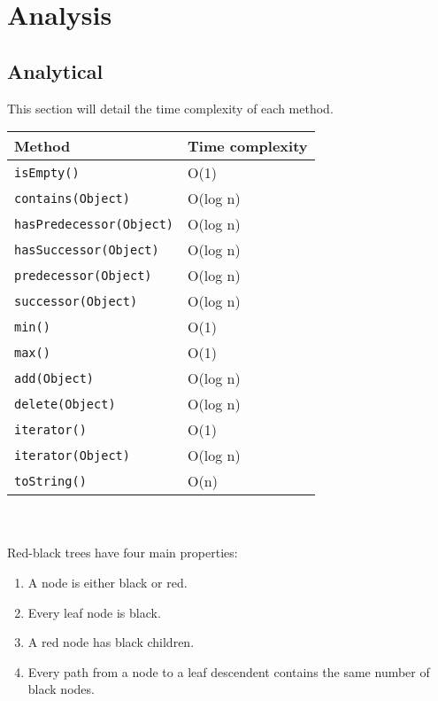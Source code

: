 \section{Analysis}

\subsection{Analytical}

This section will detail the time complexity of each method.\\

\begin{tabular}{| l | l |}
	\hline
	\textbf{Method} & \textbf{Time complexity} \\ \hline
	\texttt{isEmpty()} & O(1) \\ \hline
	\texttt{contains(Object)} & O(log n) \\ \hline
	\texttt{hasPredecessor(Object)} & O(log n) \\ \hline
	\texttt{hasSuccessor(Object)} & O(log n) \\ \hline
	\texttt{predecessor(Object)} & O(log n) \\ \hline
	\texttt{successor(Object)} & O(log n) \\ \hline
	\texttt{min()} & O(1) \\ \hline
	\texttt{max()} & O(1) \\ \hline
	\texttt{add(Object)} & O(log n) \\ \hline
	\texttt{delete(Object)} & O(log n) \\ \hline
	\texttt{iterator()} & O(1) \\ \hline
	\texttt{iterator(Object)} & O(log n) \\ \hline
	\texttt{toString()} & O(n) \\
	\hline
\end{tabular}

\texttt{}\\\\

Red-black trees have four main properties:
\begin{enumerate}
\item A node is either black or red.
\item Every leaf node is black.
\item A red node has black children.
\item Every path from a node to a leaf descendent contains the same number of black nodes.
\end{enumerate}

